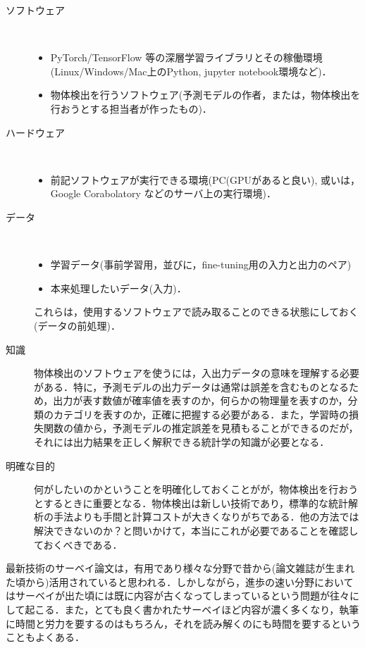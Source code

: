 \documentclass[originalpaper,fleqn]{jsaiart}     %
\begin{document}

\begin{description}
    \item[ソフトウェア]　
    \begin{itemize}
        \item PyTorch/TensorFlow 等の深層学習ライブラリとその稼働環境(Linux/Windows/Mac上のPython, jupyter notebook環境など)．
        \item 物体検出を行うソフトウェア(予測モデルの作者，または，物体検出を行おうとする担当者が作ったもの)．
    \end{itemize}
    \item[ハードウェア]　
    \begin{itemize}
        \item 前記ソフトウェアが実行できる環境(PC(GPUがあると良い), 或いは，Google Corabolatory などのサーバ上の実行環境)．
    \end{itemize}
    \item[データ]　
    \begin{itemize}
        \item 学習データ(事前学習用，並びに，fine-tuning用の入力と出力のペア)
        \item 本来処理したいデータ(入力)．
    \end{itemize}
    これらは，使用するソフトウェアで読み取ることのできる状態にしておく(データの前処理)．
    \item[知識] 物体検出のソフトウェアを使うには，入出力データの意味を理解する必要がある．特に，予測モデルの出力データは通常は誤差を含むものとなるため，出力が表す数値が確率値を表すのか，何らかの物理量を表すのか，分類のカテゴリを表すのか，正確に把握する必要がある．また，学習時の損失関数の値から，予測モデルの推定誤差を見積もることができるのだが，それには出力結果を正しく解釈できる統計学の知識が必要となる．
    \item[明確な目的] 何がしたいのかということを明確化しておくことがが，物体検出を行おうとするときに重要となる．物体検出は新しい技術であり，標準的な統計解析の手法よりも手間と計算コストが大きくなりがちである．他の方法では解決できないのか？と問いかけて，本当にこれが必要であることを確認しておくべきである．
\end{description}

最新技術のサーベイ論文は，有用であり様々な分野で昔から(論文雑誌が生まれた頃から)活用されていると思われる．しかしながら，進歩の速い分野においてはサーベイが出た頃には既に内容が古くなってしまっているという問題が往々にして起こる．また，とても良く書かれたサーベイほど内容が濃く多くなり，執筆に時間と労力を要するのはもちろん，それを読み解くのにも時間を要するということもよくある．
\end{document}
